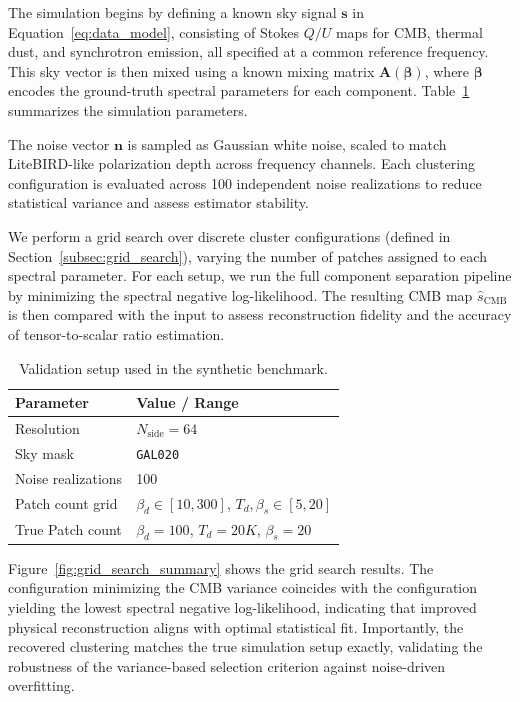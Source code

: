 \documentclass[%
 reprint,
bibnotes,
 amsmath,amssymb,
 aps,
floatfix, 
]{revtex4-2}
\begin{document}
The simulation begins by defining a known sky signal \( \mathbf{s} \) in Equation~\eqref{eq:data_model}, consisting of Stokes \( Q/U \) maps for CMB, thermal dust, and synchrotron emission, all specified at a common reference frequency. This sky vector is then mixed using a known mixing matrix \( \mathbf{A}(\boldsymbol{\beta}) \), where \( \boldsymbol{\beta} \) encodes the ground-truth spectral parameters for each component. Table~\ref{tab:validation_config} summarizes the simulation parameters.

The noise vector \( \mathbf{n} \) is sampled as Gaussian white noise, scaled to match LiteBIRD-like polarization depth across frequency channels. Each clustering configuration is evaluated across 100 independent noise realizations to reduce statistical variance and assess estimator stability.

We perform a grid search over discrete cluster configurations (defined in Section~\ref{subsec:grid_search}), varying the number of patches assigned to each spectral parameter. For each setup, we run the full component separation pipeline by minimizing the spectral negative log-likelihood. The resulting CMB map \( \hat{s}_{\mathrm{CMB}} \) is then compared with the input to assess reconstruction fidelity and the accuracy of tensor-to-scalar ratio estimation.

\begin{table}[h]
    \centering
    \small
    \caption{Validation setup used in the synthetic benchmark.}
    \label{tab:validation_config}
    \begin{tabular}{@{}p{3.5cm}|p{4.5cm}@{}}
        \toprule
        \textbf{Parameter} & \textbf{Value / Range}  \\
        \midrule
        Resolution & \( N_{\text{side}} = 64 \) \\
        Sky mask & \texttt{GAL020}  \\
        Noise realizations & 100  \\
        Patch count grid & \( \beta_d \in [10, 300] \), \( T_d, \beta_s \in [5, 20] \) \\
        True  Patch count & \( \beta_d = 100 \), \( T_d = 20 K \), \( \beta_s = 20\) \\
        \bottomrule
    \end{tabular}
\end{table}


Figure~\ref{fig:grid_search_summary} shows the grid search results. The configuration minimizing the CMB variance coincides with the configuration yielding the lowest spectral negative log-likelihood, indicating that improved physical reconstruction aligns with optimal statistical fit. Importantly, the recovered clustering matches the true simulation setup exactly, validating the robustness of the variance-based selection criterion against noise-driven overfitting.
\end{document}
